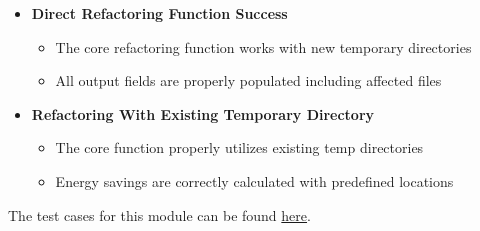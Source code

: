 \documentclass[12pt, titlepage]{article}
\begin{document}
\begin{itemize}
    \item \textbf{Direct Refactoring Function Success}
        \begin{itemize}
            \item The core refactoring function works with new temporary directories
            \item All output fields are properly populated including affected files
        \end{itemize}

    \item \textbf{Refactoring With Existing Temporary Directory}
        \begin{itemize}
            \item The core function properly utilizes existing temp directories
            \item Energy savings are correctly calculated with predefined locations
        \end{itemize}
\end{itemize}

  \noindent The test cases for this module can be found
  \href{https://github.com/ssm-lab/capstone--source-code-optimizer/blob/main/tests/api/test_refactoring.py}{here}.





\end{document}

